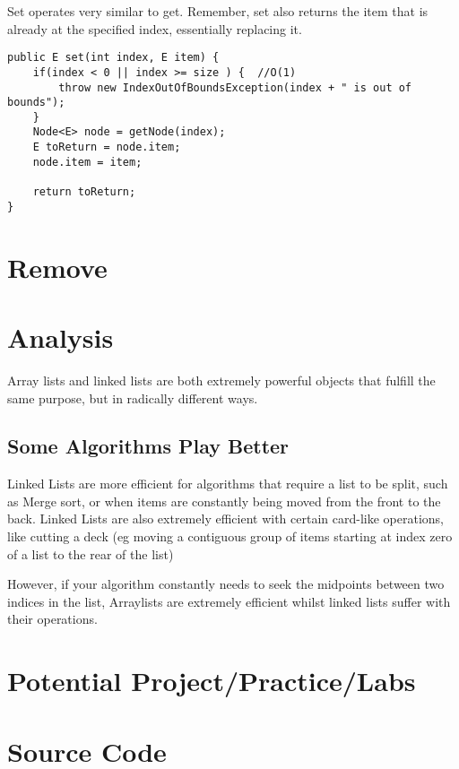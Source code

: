 Set operates very similar to get.  Remember, set also returns the item that is already at the specified index, essentially replacing it.

\begin{verbatim}
public E set(int index, E item) {
	if(index < 0 || index >= size ) {  //O(1)
		throw new IndexOutOfBoundsException(index + " is out of bounds");
	}
	Node<E> node = getNode(index);
	E toReturn = node.item;
	node.item = item;
	
	return toReturn;
}
\end{verbatim}


\section{Remove}




\section{Analysis}
Array lists and linked lists are both extremely powerful objects that fulfill  the same purpose, but in radically different ways. 




\subsection{Some Algorithms Play Better}

Linked Lists are more efficient for algorithms that require a list to be split, such as Merge sort, or when items are constantly being moved from the front to the back.
Linked Lists are also extremely efficient with certain card-like operations, like cutting a deck (eg moving a contiguous group of items starting at index zero of a list to the rear of the list)


However, if your algorithm  constantly needs to seek the midpoints between two indices in the list, Arraylists are extremely efficient whilst linked lists suffer with their operations.

\section{Potential Project/Practice/Labs}

\section{Source Code}
\inputminted{python3}{code/linkedlist.py}
